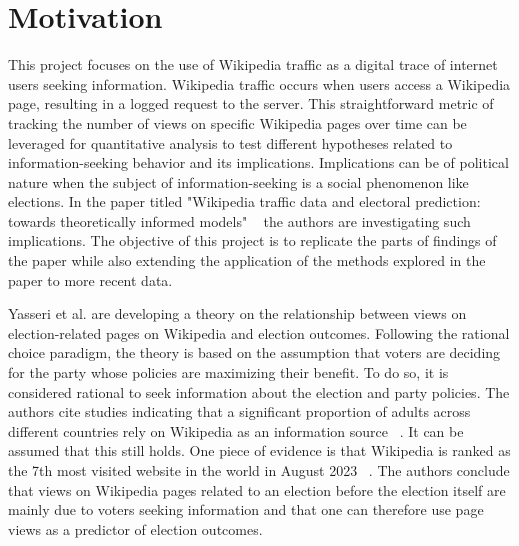 \chapter{Motivation}
\label{sec:motivation}

This project focuses on the use of Wikipedia traffic as a digital trace of internet users seeking information. Wikipedia traffic occurs when users access a Wikipedia page, resulting in a logged request to the server. This straightforward metric of tracking the number of views on specific Wikipedia pages over time can be leveraged for quantitative analysis to test different hypotheses related to information-seeking behavior and its implications. Implications can be of political nature when the subject of information-seeking is a social phenomenon like elections. In the paper titled "Wikipedia traffic data and electoral prediction: towards theoretically informed models" ~\cite{Yasseri2016Dec} the authors are investigating such implications. The objective of this project is to replicate the parts of findings of the paper while also extending the application of the methods explored in the paper to more recent data. \par 

Yasseri et al. are developing a theory on the relationship between views on election-related pages on Wikipedia and election outcomes. Following the rational choice paradigm, the theory is based on the assumption that voters are deciding for the party whose policies are maximizing their benefit. To do so, it is considered rational to seek information about the election and party policies. The authors cite studies indicating that a significant proportion of adults across different countries rely on Wikipedia as an information source ~\cite{Rainie2020May, Ofcom2015}. It can be assumed that this still holds. One piece of evidence is that Wikipedia is ranked as the 7th most visited website in the world in August 2023 ~\cite{BibEntry2023Aug}. The authors conclude that views on Wikipedia pages related to an election before the election itself are mainly due to voters seeking information and that one can therefore use page views as a predictor of election outcomes. 

